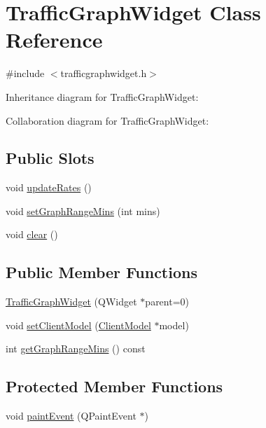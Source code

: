 \hypertarget{class_traffic_graph_widget}{}\section{Traffic\+Graph\+Widget Class Reference}
\label{class_traffic_graph_widget}


{\ttfamily \#include $<$trafficgraphwidget.\+h$>$}



Inheritance diagram for Traffic\+Graph\+Widget\+:


Collaboration diagram for Traffic\+Graph\+Widget\+:
\subsection*{Public Slots}
\begin{DoxyCompactItemize}
\item 
void \hyperlink{class_traffic_graph_widget_a5a1ae0d0a8cc43c67386de4aa1111340}{update\+Rates} ()
\item 
void \hyperlink{class_traffic_graph_widget_aa08cb5ae735e58a79bdff42b933ec4c4}{set\+Graph\+Range\+Mins} (int mins)
\item 
void \hyperlink{class_traffic_graph_widget_a71c23db2649ab8781fa9a294e540b7ee}{clear} ()
\end{DoxyCompactItemize}
\subsection*{Public Member Functions}
\begin{DoxyCompactItemize}
\item 
\hyperlink{class_traffic_graph_widget_a99f4f3f14bab99bef8918cb4f5f69aa6}{Traffic\+Graph\+Widget} (Q\+Widget $\ast$parent=0)
\item 
void \hyperlink{class_traffic_graph_widget_a8f627aaf6171695d94a0e83b239fe1ac}{set\+Client\+Model} (\hyperlink{class_client_model}{Client\+Model} $\ast$model)
\item 
int \hyperlink{class_traffic_graph_widget_a5ce07b8f9c222d49bcc65703fbaf9be6}{get\+Graph\+Range\+Mins} () const 
\end{DoxyCompactItemize}
\subsection*{Protected Member Functions}
\begin{DoxyCompactItemize}
\item 
void \hyperlink{class_traffic_graph_widget_a728112be94b731a17ff36136e48adcb2}{paint\+Event} (Q\+Paint\+Event $\ast$)
\end{DoxyCompactItemize}


